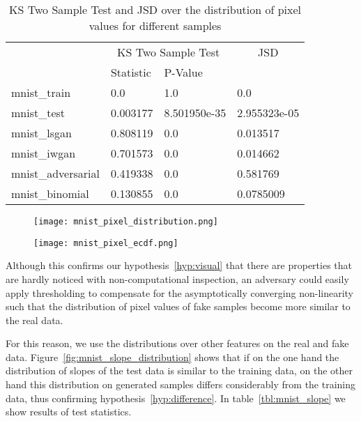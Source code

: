 \begin{table}[!h]
\centering
\caption{KS Two Sample Test and JSD over the distribution of pixel values for
different samples}
\label{tbl:mnist_pixel}
\begin{tabular}{l|ll|l|}
                   & \multicolumn{2}{c|}{\cellcolor[HTML]{C0C0C0}KS Two Sample Test} & \multicolumn{1}{c|}{\cellcolor[HTML]{C0C0C0}JSD} \\
                   & Statistic   & P-Value        &                \\
mnist\_train       & 0.0         & 1.0            & 0.0            \\
mnist\_test        & 0.003177    & 8.501950e-35   & 2.955323e-05   \\
mnist\_lsgan       & 0.808119    & 0.0            & 0.013517       \\
mnist\_iwgan       & 0.701573    & 0.0            & 0.014662       \\
mnist\_adversarial & 0.419338    & 0.0            & 0.581769       \\
mnist\_binomial    & 0.130855    & 0.0            & 0.0785009      
\end{tabular}
\end{table}


\begin{figure}[!h]
  \texttt{[image: mnist\_pixel\_distribution.png]}
  \caption{}
  \label{fig:mnist_pixel_distribution}
\end{figure}


\begin{figure}[!h]
  \texttt{[image: mnist\_pixel\_ecdf.png]}
  \caption{}
  \label{fig:mnist_pixel_ecdf}
\end{figure}


Although this confirms our hypothesis~\ref{hyp:visual} that there are properties
that are hardly noticed with non-computational inspection, an adversary could
easily apply thresholding to compensate for the asymptotically converging
non-linearity such that the distribution of pixel values of fake
samples become more similar to the real data.

For this reason, we use the distributions over other features on the real and
fake data. Figure~\ref{fig:mnist_slope_distribution} shows
that if on the one hand the distribution of slopes of the test data is similar to the
training data, on the other hand this distribution on generated samples differs
considerably from the training data, thus confirming hypothesis~\ref{hyp:difference}.
In table~\ref{tbl:mnist_slope} we show results of test statistics.

